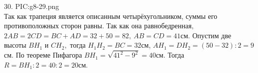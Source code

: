 30. {{PIC:g8-29.png}}\\
Так как трапеция является описанным четырёхугольником, суммы его противоположных сторон равны. Так как она равнобедренная, $2AB=2CD=BC+AD=32+50=82,\ AB=CD=41$см. Опустим две высоты $BH_1$ и $CH_2,$ тогда $H_1H_2=BC=32$см, $AH_1=DH_2=(50-32):2=9$см. По теореме Пифагора $BH_1=\sqrt{41^2-9^2}=40$см. Тогда $R=BH_1:2=40:2=20$см.\newpage\noindent
